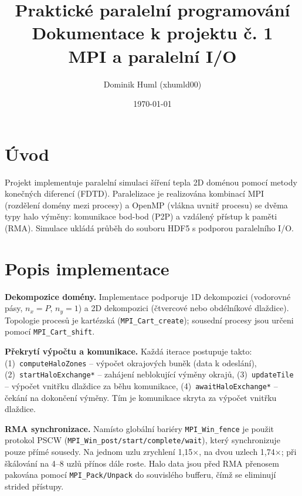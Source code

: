 \documentclass{article}
\title{Praktické paralelní programování\\Dokumentace k projektu č. 1\\MPI a paralelní I/O}
\author{Dominik Huml (xhumld00)}
\date{\today}
\begin{document}
\maketitle

\section{Úvod}
\label{sec:uvod}

Projekt implementuje paralelní simulaci šíření tepla 2D doménou pomocí
metody konečných diferencí (FDTD).
Paralelizace je realizována kombinací MPI (rozdělení domény mezi procesy)
a OpenMP (vlákna uvnitř procesu) se dvěma typy halo výměny:
komunikace bod-bod (P2P) a vzdálený přístup k paměti (RMA).
Simulace ukládá průběh do souboru HDF5 s podporou paralelního I/O.

\section{Popis implementace}
\label{sec:implementace}

\textbf{Dekompozice domény.}
Implementace podporuje 1D dekompozici (vodorovné pásy, $n_x = P$, $n_y = 1$)
a 2D dekompozici (čtvercové nebo obdélníkové dlaždice).
Topologie procesů je kartézská (\texttt{MPI\_Cart\_create});
sousední procesy jsou určeni pomocí \texttt{MPI\_Cart\_shift}.

\textbf{Překrytí výpočtu a komunikace.}
Každá iterace postupuje takto:
(1)~\texttt{computeHaloZones} – výpočet okrajových buněk (data k odeslání),
(2)~\texttt{startHaloExchange*} – zahájení neblokující výměny okrajů,
(3)~\texttt{updateTile} – výpočet vnitřku dlaždice za běhu komunikace,
(4)~\texttt{awaitHaloExchange*} – čekání na dokončení výměny.
Tím je komunikace skryta za výpočet vnitřku dlaždice.

\textbf{RMA synchronizace.}
Namísto globální bariéry \texttt{MPI\_Win\_fence} je použit protokol PSCW
(\texttt{MPI\_Win\_post/start/complete/wait}), který synchronizuje pouze
přímé sousedy. Na jednom uzlu zrychlení 1{,}15$\times$, na dvou uzlech
1{,}74$\times$; při škálování na 4–8 uzlů přínos dále roste.
Halo data jsou před RMA přenosem pakována pomocí \texttt{MPI\_Pack/Unpack}
do souvislého bufferu, čímž se eliminují strided přístupy.
\end{document}
